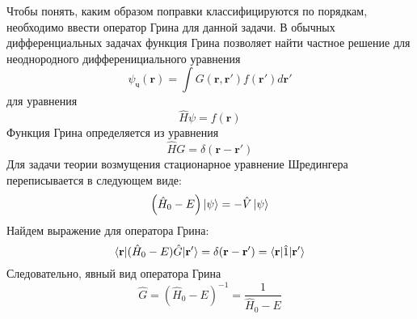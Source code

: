 \documentclass{article}
\begin{document}
\begin{enumerate}
		
		\clearpage		
		Чтобы понять, каким образом поправки классифицируются по порядкам, необходимо ввести оператор Грина для данной задачи. В обычных дифференциальных задачах функция Грина позволяет найти частное решение для неоднородного дифференициального уравнения
		\begin{equation}
			\psi_{\text{ч}}(\textbf{r}) = \int G(\textbf{r},\textbf{r}') f(\textbf{r}') d\textbf{r}'
		\end{equation}
		для уравнения
		\begin{equation}
			\hat{H} \psi = f(\textbf{r})
		\end{equation}
		Функция Грина определяется из уравнения
		\begin{equation}
			\hat{H}G = \delta(\textbf{r}-\textbf{r}')
		\end{equation}
		Для задачи теории возмущения стационарное уравнение Шредингера переписывается в следующем виде:
		\begin{equation}
			\Big(\hat{H}_0 - E \Big)\ket{\psi} = - \hat{V}\ket{\psi}
		\end{equation}
		Найдем выражение для оператора Грина:
		\begin{equation}
			\braket{\textbf{r}| (\hat{H}_0 - E) \hat{G}|\textbf{r}'} = \delta(\textbf{r}-\textbf{r}') = \braket{\textbf{r}|\hat{1}|\textbf{r}'}
		\end{equation}
		Следовательно, явный вид оператора Грина
		\begin{equation}
			\hat{G} = (\hat{H}_0 - E)^{-1} = \frac{1}{\hat{H}_0 - E}
		\end{equation}
	\end{enumerate}
\end{document}
